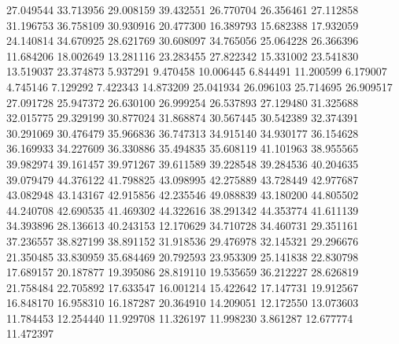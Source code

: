 27.049544
33.713956
29.008159
39.432551
26.770704
26.356461
27.112858
31.196753
36.758109
30.930916
20.477300
16.389793
15.682388
17.932059
24.140814
34.670925
28.621769
30.608097
34.765056
25.064228
26.366396
11.684206
18.002649
13.281116
23.283455
27.822342
15.331002
23.541830
13.519037
23.374873
5.937291
9.470458
10.006445
6.844491
11.200599
6.179007
4.745146
7.129292
7.422343
14.873209
25.041934
26.096103
25.714695
26.909517
27.091728
25.947372
26.630100
26.999254
26.537893
27.129480
31.325688
32.015775
29.329199
30.877024
31.868874
30.567445
30.542389
32.374391
30.291069
30.476479
35.966836
36.747313
34.915140
34.930177
36.154628
36.169933
34.227609
36.330886
35.494835
35.608119
41.101963
38.955565
39.982974
39.161457
39.971267
39.611589
39.228548
39.284536
40.204635
39.079479
44.376122
41.798825
43.098995
42.275889
43.728449
42.977687
43.082948
43.143167
42.915856
42.235546
49.088839
43.180200
44.805502
44.240708
42.690535
41.469302
44.322616
38.291342
44.353774
41.611139
34.393896
28.136613
40.243153
12.170629
34.710728
34.460731
29.351161
37.236557
38.827199
38.891152
31.918536
29.476978
32.145321
29.296676
21.350485
33.830959
35.684469
20.792593
23.953309
25.141838
22.830798
17.689157
20.187877
19.395086
28.819110
19.535659
36.212227
28.626819
21.758484
22.705892
17.633547
16.001214
15.422642
17.147731
19.912567
16.848170
16.958310
16.187287
20.364910
14.209051
12.172550
13.073603
11.784453
12.254440
11.929708
11.326197
11.998230
3.861287
12.677774
11.472397
